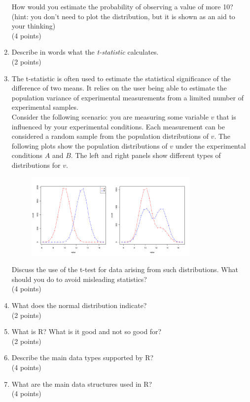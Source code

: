 \documentclass[11pt]{article}
\begin{document}
\begin{enumerate}
\begin{figure}[H]
  \end{figure}
  How would you estimate the probability of
  observing a value of more 10?\\
  (hint: you don't need to plot the distribution, but it is shown as an aid to
  your thinking)\\
  (4 points)
\item Describe in words what the \emph{t-statistic} calculates.\\
  (2 points)
\item The t-statistic is often used to estimate the statistical significance
  of the difference of two means. It relies on the user being able to estimate
  the population variance of experimental measurements from a limited number
  of experimental samples.\\
  Consider the following scenario: you are measuring
  some variable $v$ that is influenced by your experimental conditions. Each
  measurement can be considered a random sample from the population distributions of
  $v$. The following plots show the population distributions of $v$ under the
  experimental conditions $A$ and $B$. The left and right panels show
  different types of distributions for $v$. 
  \begin{figure}[H]
    \includegraphics[width=0.8\textwidth]{R/binorm}
  \end{figure}
  Discuss the use of the t-test for
  data arising from such distributions. What should you do to avoid misleading
  statistics?\\
  (4 points)
\item What does the normal distribution indicate?\\
  (2 points)

\item What is R? What is it good and not so good for?\\
  (2 points)
\item Describe the main data types supported by R?\\
  (4 points)
\item What are the main data structures used in R?\\
  (4 points)


\end{enumerate}
\end{document}
